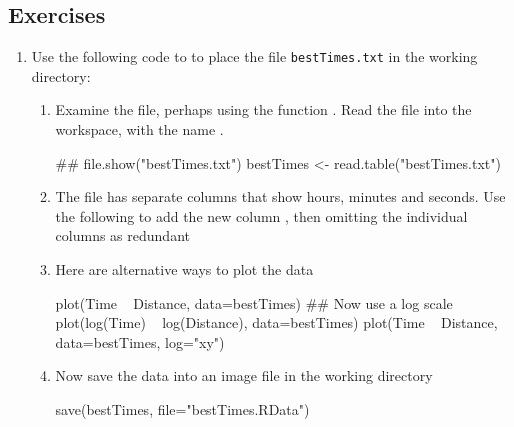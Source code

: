 \subsection{Exercises}\label{ss:ch2ex}

\begin{enumerate}
\item Use the following code to to place the file 
\texttt{bestTimes.txt} in the working directory:

\begin{enumerate}
\item  Examine the file, perhaps using the function .
Read the file into the workspace, with the name .
\begin{Schunk}
\begin{Sinput}
## file.show("bestTimes.txt")
bestTimes <- read.table("bestTimes.txt")
\end{Sinput}
\end{Schunk}
\item The  file has separate columns that show hours,
  minutes and seconds.  Use the following to add the new column
  , then omitting the individual columns as redundant
\begin{Schunk}
\end{Schunk}
\item Here are alternative ways to plot the data
\begin{Schunk}
\begin{Sinput}
plot(Time ~ Distance, data=bestTimes)
## Now use a log scale
plot(log(Time) ~ log(Distance), data=bestTimes)
plot(Time ~ Distance, data=bestTimes, log="xy")
\end{Sinput}
\end{Schunk}
\item Now save the data into an image file in the working directory
\begin{Schunk}
\begin{Sinput}
save(bestTimes, file="bestTimes.RData")
\end{Sinput}
\end{Schunk}

\end{enumerate}
\end{enumerate}
